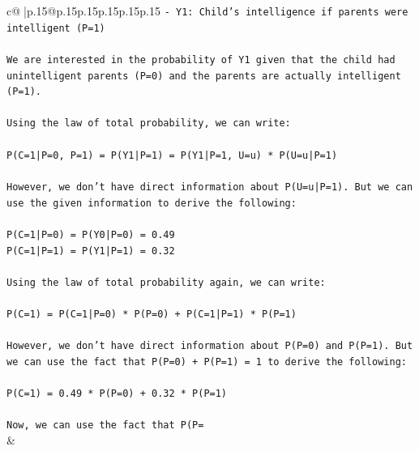 \documentclass{article}
\begin{document}
{\begin{supertabular}{c@{$\;$}|p{.15\linewidth}@{}p{.15\linewidth}p{.15\linewidth}p{.15\linewidth}p{.15\linewidth}p{.15\linewidth}}
{{{\texttt{{-} Y1: Child's intelligence if parents were intelligent (P=1)} \\
\\ 
\texttt{We are interested in the probability of Y1 given that the child had unintelligent parents (P=0) and the parents are actually intelligent (P=1).} \\
\\ 
\texttt{Using the law of total probability, we can write:} \\
\\ 
\texttt{P(C=1|P=0, P=1) = P(Y1|P=1) = P(Y1|P=1, U=u) * P(U=u|P=1)} \\
\\ 
\texttt{However, we don't have direct information about P(U=u|P=1). But we can use the given information to derive the following:} \\
\\ 
\texttt{P(C=1|P=0) = P(Y0|P=0) = 0.49} \\
\texttt{P(C=1|P=1) = P(Y1|P=1) = 0.32} \\
\\ 
\texttt{Using the law of total probability again, we can write:} \\
\\ 
\texttt{P(C=1) = P(C=1|P=0) * P(P=0) + P(C=1|P=1) * P(P=1)} \\
\\ 
\texttt{However, we don't have direct information about P(P=0) and P(P=1). But we can use the fact that P(P=0) + P(P=1) = 1 to derive the following:} \\
\\ 
\texttt{P(C=1) = 0.49 * P(P=0) + 0.32 * P(P=1)} \\
\\ 
\texttt{Now, we can use the fact that P(P=} \\
            }
        }
    }
    & \\ \\


\end{supertabular}}
\end{document}
